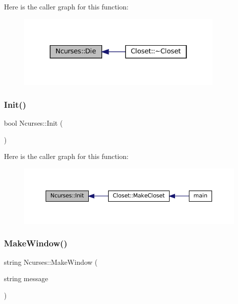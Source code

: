 Here is the caller graph for this function\+:\nopagebreak
\begin{figure}[H]
\begin{center}
\leavevmode
\includegraphics[width=286pt]{classNcurses_af9467a004e66043d4dbe540e24524f1f_icgraph}
\end{center}
\end{figure}
\mbox{\label{classNcurses_a9966b2b23b522e415232976acfa1d18f}} 
\subsubsection{\texorpdfstring{Init()}{Init()}}
{\footnotesize\ttfamily bool Ncurses\+::\+Init (\begin{DoxyParamCaption}{ }\end{DoxyParamCaption})}

Here is the caller graph for this function\+:\nopagebreak
\begin{figure}[H]
\begin{center}
\leavevmode
\includegraphics[width=350pt]{classNcurses_a9966b2b23b522e415232976acfa1d18f_icgraph}
\end{center}
\end{figure}
\mbox{\label{classNcurses_a1d8def11419a444c5696b5043da680d4}} 
\subsubsection{\texorpdfstring{Make\+Window()}{MakeWindow()}}
{\footnotesize\ttfamily string Ncurses\+::\+Make\+Window (\begin{DoxyParamCaption}\item[{string}]{message }\end{DoxyParamCaption})}

